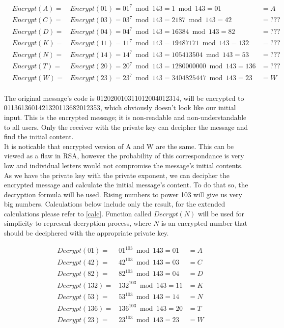 \documentclass[a4paper, 12pt]{article}
\begin{document}
\begin{align*}
  &Encrypt(A)=&Encrypt(01)=01^7 \bmod 143=1 \bmod 143=01&=A\\
  &Encrypt(C)=&Encrypt(03)=03^7 \bmod 143=2187 \bmod 143=42&=???\\
  &Encrypt(D)=&Encrypt(04)=04^7 \bmod 143=16384 \bmod 143=82&=???\\
  &Encrypt(K)=&Encrypt(11)=11^7 \bmod 143=19487171 \bmod 143=132&=???\\
  &Encrypt(N)=&Encrypt(14)=14^7 \bmod 143=105413504 \bmod 143=53&=???\\
  &Encrypt(T)=&Encrypt(20)=20^7 \bmod 143=1280000000 \bmod 143=136&=???\\
  &Encrypt(W)=&Encrypt(23)=23^7 \bmod 143=3404825447 \bmod 143=23&=W\\
\end{align*}

The original message's code is 012020010311012004012314, will be encrypted to
0113613601421320113682012353, which obviously doesn’t look like our initial input. This is
the encrypted message; it is non-readable and non-understandable to all users. Only the receiver
with the private key can decipher the message and find the initial content.\\

It is noticable that encrypted version of A and W are the same. This can be viewed as a flaw in RSA, however
the probability of this correspondance is very low and individual letters would not compromise the message's
initial contents.\\

As we have the private key with the private exponent, we can decipher the encrypted message and
calculate the initial message’s content. To do that so, the decryption formula will be used. Rising
numbers to power 103 will give us very big numbers. Calculations below include only the result,
for the extended calculations please refer to \ref{calc}. Function called $Decrypt(N)$ will be used
for simplicity to represent decryption process, where $N$ is an encrypted number that should be
deciphered with the appropriate private key.

\begin{align*}
  &Decrypt(01)=&01^{103} \bmod 143=01&=A\\
  &Decrypt(42)=&42^{103} \bmod 143=03&=C\\
  &Decrypt(82)=&82^{103} \bmod 143=04&=D\\
  &Decrypt(132)=&132^{103} \bmod 143=11&=K\\
  &Decrypt(53)=&53^{103} \bmod 143=14&=N\\
  &Decrypt(136)=&136^{103} \bmod 143=20&=T\\
  &Decrypt(23)=&23^{103} \bmod 143=23&=W\\
\end{align*}
\end{document}
